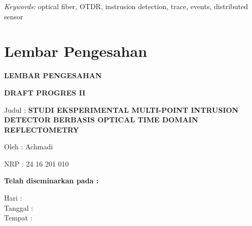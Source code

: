 \documentclass[12pt]{article}
\providecommand{\keyworden}[1]{\textit{Keywords: } #1}
\begin{document}
	\keyworden{optical fiber, OTDR, instrusion detection, trace, events, distributed sensor}
	

\newpage
\thispagestyle{plain}
\mbox{}


\newpage

	\section{Lembar Pengesahan}
	
	\begin{center}
		\textbf{LEMBAR PENGESAHAN}
	\end{center}
	
	\begin{center}
		\textbf{DRAFT PROGRES II}
	\end{center}

	\vspace{10pt}

	\begin{flushleft}
		Judul	: \textbf{STUDI EKSPERIMENTAL MULTI-POINT INTRUSION DETECTOR BERBASIS OPTICAL TIME DOMAIN REFLECTOMETRY}
	\end{flushleft}

	\begin{flushleft}
		Oleh : Achmadi
	\end{flushleft}

	\begin{flushleft}
		NRP : 24 16 201 010
	\end{flushleft}

	\vspace{20pt}
	
	\begin{center}
		\textbf{Telah diseminarkan pada :}
	\end{center}

	\vspace{10pt}

	\begin{flushleft}
		Hari \hspace{17pt}: \\
		Tanggal :\\
		Tempat \hspace{3pt}:  \\
	\end{flushleft}
\end{document}
